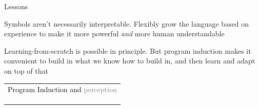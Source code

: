 \documentclass{beamer}
\begin{document}
\begin{frame}{Lessons}

  Symbols aren't necessarily interpretable. Flexibly grow the language based on experience to make it more powerful \emph{and} more human understandable

  \vspace{1cm}

  Learning-from-scratch is possible in principle. But program induction makes it convenient to build in what we know how to build in, and then learn and adapt on top of that
\end{frame}

\begin{frame}{}
  \begin{center}
    \begin{tabular}{l}
      {\textcolor{black}{Program Induction and }\textcolor{gray}{perception}}\\
      \phantom{Program Induction and }{\textcolor{gray}{learning to learn}}\\
      \phantom{Program Induction and }{\textcolor{gray}{model discovery}}\\
      \phantom{Program Induction and }{\textcolor{black}{the future}}
      \end{tabular}
  \end{center}
\end{frame}
\end{document}
